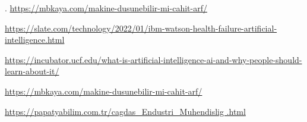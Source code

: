 \documentclass{article}
\begin{document}
\vspace{20pt}
\begin{thebibliography}
    . \href{https://mbkaya.com/makine-dusunebilir-mi-cahit-arf/}{https://mbkaya.com/makine-dusunebilir-mi-cahit-arf/}

     \href{https://slate.com/technology/2022/01/ibm-watson-health-failure-artificial-intelligence.html}{https://slate.com/technology/2022/01/ibm-watson-health-failure-artificial-intelligence.html}

    \href{https://incubator.ucf.edu/what-is-artificial-intelligence-ai-and-why-people-should-learn-about-it/}
    {https://incubator.ucf.edu/what-is-artificial-intelligence-ai-and-why-people-should-learn-about-it/}

     \href{https://mbkaya.com/makine-dusunebilir-mi-cahit-arf/}{https://mbkaya.com/makine-dusunebilir-mi-cahit-arf/}

     \href{https://papatyabilim.com.tr/cagdas_endustri_muhendisligi.html/}{https://papatyabilim.com.tr/cagdas_Endustri_Muhendislig .html}


\end{thebibliography}
\end{document}
